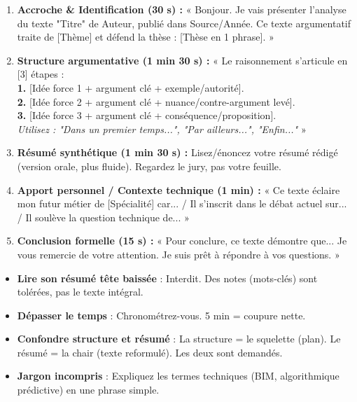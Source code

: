 \documentclass[11pt]{article}
\begin{document}
\begin{methode}[Canevas de l'exposé oral de 5 minutes (1 minute = 130 mots env.)]
\begin{enumerate}
    \item \textbf{Accroche \& Identification (30 s) :} « Bonjour. Je vais présenter l'analyse du texte "Titre" de Auteur, publié dans Source/Année. Ce texte argumentatif traite de [Thème] et défend la thèse : [Thèse en 1 phrase]. »
    \item \textbf{Structure argumentative (1 min 30 s) :} « Le raisonnement s'articule en [3] étapes : \\ \textbf{1.} [Idée force 1 + argument clé + exemple/autorité]. \\ \textbf{2.} [Idée force 2 + argument clé + nuance/contre-argument levé]. \\ \textbf{3.} [Idée force 3 + argument clé + conséquence/proposition]. \\ \textit{Utilisez : "Dans un premier temps...", "Par ailleurs...", "Enfin..."} »
    \item \textbf{Résumé synthétique (1 min 30 s) :} Lisez/énoncez votre résumé rédigé (version orale, plus fluide). Regardez le jury, pas votre feuille.
    \item \textbf{Apport personnel / Contexte technique (1 min) :} « Ce texte éclaire mon futur métier de [Spécialité] car... / Il s'inscrit dans le débat actuel sur... / Il soulève la question technique de... »
    \item \textbf{Conclusion formelle (15 s) :} « Pour conclure, ce texte démontre que... Je vous remercie de votre attention. Je suis prêt à répondre à vos questions. »
\end{enumerate}
\end{methode}

\begin{attention}
\begin{itemize}
    \item \textbf{Lire son résumé tête baissée} : Interdit. Des notes (mots-clés) sont tolérées, pas le texte intégral.
    \item \textbf{Dépasser le temps} : Chronométrez-vous. 5 min = coupure nette.
    \item \textbf{Confondre structure et résumé} : La structure = le squelette (plan). Le résumé = la chair (texte reformulé). Les deux sont demandés.
    \item \textbf{Jargon incompris} : Expliquez les termes techniques (BIM, algorithmique prédictive) en une phrase simple.
\end{itemize}
\end{attention}
\end{document}
